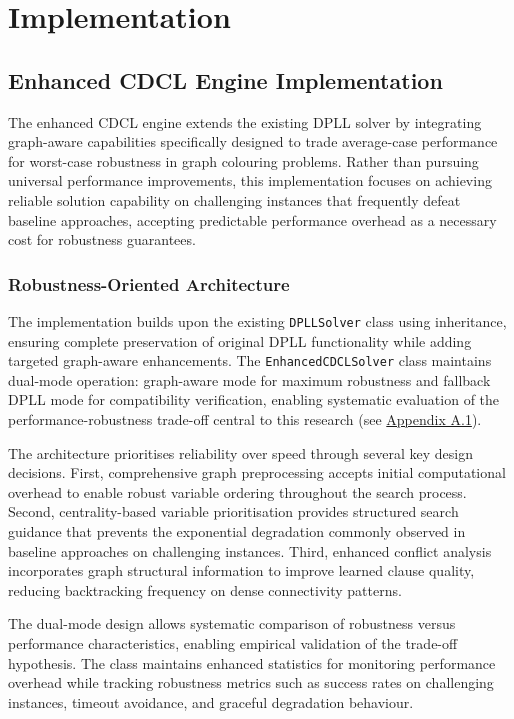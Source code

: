 \section{Implementation}

\subsection{Enhanced CDCL Engine Implementation}

The enhanced CDCL engine extends the existing DPLL solver by integrating graph-aware capabilities specifically designed to trade average-case performance for worst-case robustness in graph colouring problems. Rather than pursuing universal performance improvements, this implementation focuses on achieving reliable solution capability on challenging instances that frequently defeat baseline approaches, accepting predictable performance overhead as a necessary cost for robustness guarantees.

\subsubsection{Robustness-Oriented Architecture}

The implementation builds upon the existing \texttt{DPLLSolver} class using inheritance, ensuring complete preservation of original DPLL functionality while adding targeted graph-aware enhancements. The \texttt{EnhancedCDCLSolver} class maintains dual-mode operation: graph-aware mode for maximum robustness and fallback DPLL mode for compatibility verification, enabling systematic evaluation of the performance-robustness trade-off central to this research (see \hyperref[appendix:enhanced-cdcl-class]{Appendix A.1}).

The architecture prioritises reliability over speed through several key design decisions. First, comprehensive graph preprocessing accepts initial computational overhead to enable robust variable ordering throughout the search process. Second, centrality-based variable prioritisation provides structured search guidance that prevents the exponential degradation commonly observed in baseline approaches on challenging instances. Third, enhanced conflict analysis incorporates graph structural information to improve learned clause quality, reducing backtracking frequency on dense connectivity patterns.

The dual-mode design allows systematic comparison of robustness versus performance characteristics, enabling empirical validation of the trade-off hypothesis. The class maintains enhanced statistics for monitoring performance overhead while tracking robustness metrics such as success rates on challenging instances, timeout avoidance, and graceful degradation behaviour.

